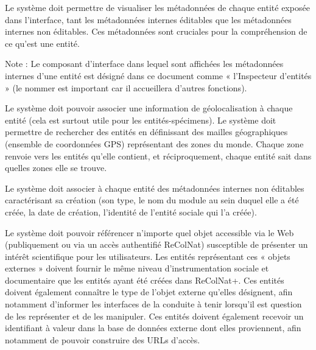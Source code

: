 \startsubsection[title={Métadonnées internes}]

\exig{}
Le système doit permettre de visualiser les métadonnées de chaque entité exposée dans l'interface, tant les métadonnées internes éditables que les métadonnées internes non éditables.
Ces métadonnées sont cruciales pour la compréhension de ce qu'est une entité.

Note :
Le composant d'interface dans lequel sont affichées les métadonnées internes d'une entité est désigné dans ce document comme « l'Inspecteur d'entités » (le nommer est important car il accueillera d'autres fonctions).

\exig{}
Le système doit pouvoir associer une information de géolocalisation à chaque entité (cela est surtout utile pour les entités-spécimens).
Le système doit permettre de rechercher des entités en définissant des mailles géographiques (ensemble de coordonnées GPS) représentant des zones du monde.
Chaque zone renvoie vers les entités qu'elle contient, et réciproquement, chaque entité sait dans quelles zones elle se trouve.

\startsubsubsection[title={Métadonnées internes non éditables}]

\exig{}
Le système doit associer à chaque entité des métadonnées internes non éditables caractérisant sa création (son type, le nom du module au sein duquel elle a été créée, la date de création, l'identité de l'entité sociale qui l'a créée).

\exig{}
Le système doit pouvoir référencer n'importe quel objet accessible via le Web (publiquement ou via un accès authentifié ReColNat) susceptible de présenter un intérêt scientifique pour les utilisateurs.
Les entités représentant ces « objets externes » doivent fournir le même niveau d'instrumentation sociale et documentaire que les entités ayant été créées dans ReColNat+.
Ces entités doivent également connaître le type de l'objet externe qu'elles désignent, afin notamment d'informer les interfaces de la conduite à tenir lorsqu'il est question de les représenter et de les manipuler.
Ces entités doivent également recevoir un identifiant à valeur dans la base de données externe dont elles proviennent, afin notamment de pouvoir construire des URLs d'accès.

